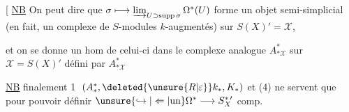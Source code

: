 
[ \uline{NB} On peut dire que $\sigma\longmapsto\varinjlim_{U\supset\operatorname{supp}\sigma}\Omega^*(U)$ forme un  objet semi-simplicial (en fait, un complexe de $S$-modules $k$-augmentés) sur $S(X)'=\mathcal{X}$,


et on se donne un hom de celui-ci dans le complexe analogue $A^\ast_{*\mathcal X}$ sur $\mathcal X=S(X)'$ défini par $A^\ast_{*\mathcal X}$

\uline{NB} finalement \textcircled{1} $(A_*^*,\deleted{\unsure{R|\varepsilon}}k_*,K_*)$ et (4) ne servent que pour pouvoir définir $\unsure{\hookrightarrow|\Leftarrow|\text{un}}\Omega^*\longrightarrow S^{*\,\prime}_X$ comp. 

